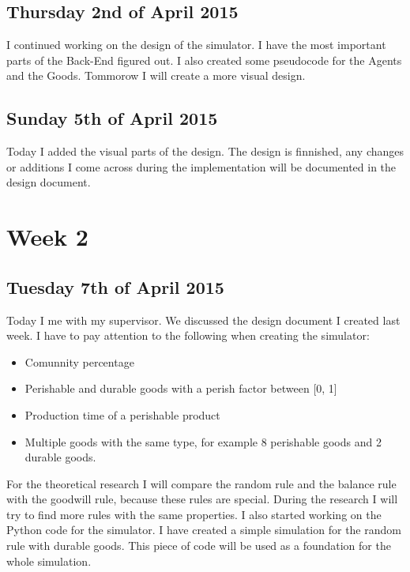 \documentclass{article}
\begin{document}
\subsection{Thursday 2nd of April 2015}
I continued working on the design of the simulator. I have the most important parts of the Back-End figured out. I also created some pseudocode for the Agents and the Goods. Tommorow I will create a more visual design.

\subsection{Sunday 5th of April 2015}
Today I added the visual parts of the design. The design is finnished, any changes or additions I come across during the implementation will be documented in the design document.

\section{Week 2}
\subsection{Tuesday 7th of April 2015}
Today I me with my supervisor. We discussed the design document I created last week. I have to pay attention to the following when creating the simulator:

\begin{itemize}
  \item Comunnity percentage
  \item Perishable and durable goods with a perish factor between [0, 1]
  \item Production time of a perishable product
  \item Multiple goods with the same type, for example 8 perishable goods and 2 durable goods.
\end{itemize}
For the theoretical research I will compare the random rule and the balance rule with the goodwill rule, because these rules are special. During the research I will try to find more rules with the same properties.
I also started working on the Python code for the simulator. I have created a simple simulation for the random rule with durable goods. This piece of code will be used as a foundation for the whole simulation.
\end{document}
